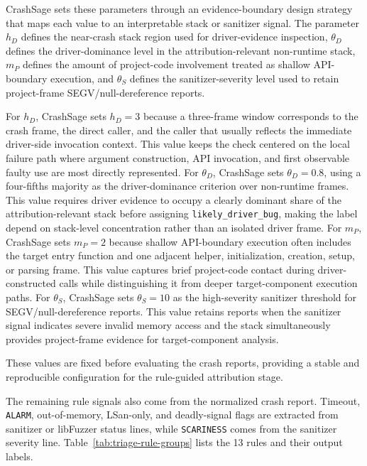 \documentclass[pdflatex,sn-basic]{sn-jnl}%
\theoremstyle{thmstyleone}%
\theoremstyle{thmstyletwo}%
\theoremstyle{thmstylethree}%
\begin{document}
CrashSage sets these parameters through an evidence-boundary design strategy that maps each value to an interpretable stack or sanitizer signal.
The parameter \(h_D\) defines the near-crash stack region used for driver-evidence inspection, \(\theta_D\) defines the driver-dominance level in the attribution-relevant non-runtime stack, \(m_P\) defines the amount of project-code involvement treated as shallow API-boundary execution, and \(\theta_S\) defines the sanitizer-severity level used to retain project-frame SEGV/null-dereference reports.

For \(h_D\), CrashSage sets \(h_D=3\) because a three-frame window corresponds to the crash frame, the direct caller, and the caller that usually reflects the immediate driver-side invocation context.
This value keeps the check centered on the local failure path where argument construction, API invocation, and first observable faulty use are most directly represented.
For \(\theta_D\), CrashSage sets \(\theta_D=0.8\), using a four-fifths majority as the driver-dominance criterion over non-runtime frames.
This value requires driver evidence to occupy a clearly dominant share of the attribution-relevant stack before assigning \texttt{likely\_driver\_bug}, making the label depend on stack-level concentration rather than an isolated driver frame.
For \(m_P\), CrashSage sets \(m_P=2\) because shallow API-boundary execution often includes the target entry function and one adjacent helper, initialization, creation, setup, or parsing frame.
This value captures brief project-code contact during driver-constructed calls while distinguishing it from deeper target-component execution paths.
For \(\theta_S\), CrashSage sets \(\theta_S=10\) as the high-severity sanitizer threshold for SEGV/null-dereference reports.
This value retains reports when the sanitizer signal indicates severe invalid memory access and the stack simultaneously provides project-frame evidence for target-component analysis.

These values are fixed before evaluating the crash reports, providing a stable and reproducible configuration for the rule-guided attribution stage.

The remaining rule signals also come from the normalized crash report.
Timeout, \texttt{ALARM}, out-of-memory, LSan-only, and deadly-signal flags are extracted from sanitizer or libFuzzer status lines, while \texttt{SCARINESS} comes from the sanitizer severity line.
Table~\ref{tab:triage-rule-groups} lists the 13 rules and their output labels.
\end{document}
